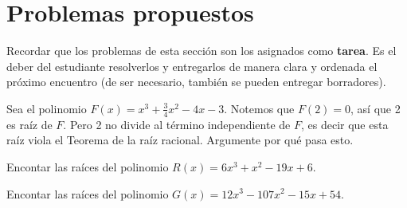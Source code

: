 \section{Problemas propuestos}

Recordar que los problemas de esta sección son los asignados como \textbf{tarea}.
Es el deber del estudiante resolverlos y entregarlos de manera clara y ordenada el próximo encuentro
(de ser necesario, también se pueden entregar borradores).

\begin{section-problem}
    Sea el polinomio $F(x) = x^3 + \frac{3}{4}x^2 - 4x - 3$.
    Notemos que $F(2) = 0$, así que 2 es raíz de $F$.
    Pero 2 no divide al término independiente de $F$, es decir que esta raíz viola el Teorema de la raíz racional.
    Argumente por qué pasa esto.
\end{section-problem}

\begin{section-problem}
    Encontar las raíces del polinomio $R(x) = 6x^3 + x^2 - 19x + 6$.
\end{section-problem}

\begin{section-problem}
    Encontar las raíces del polinomio $G(x) = 12x^3 - 107x^2 - 15x + 54$.
\end{section-problem}